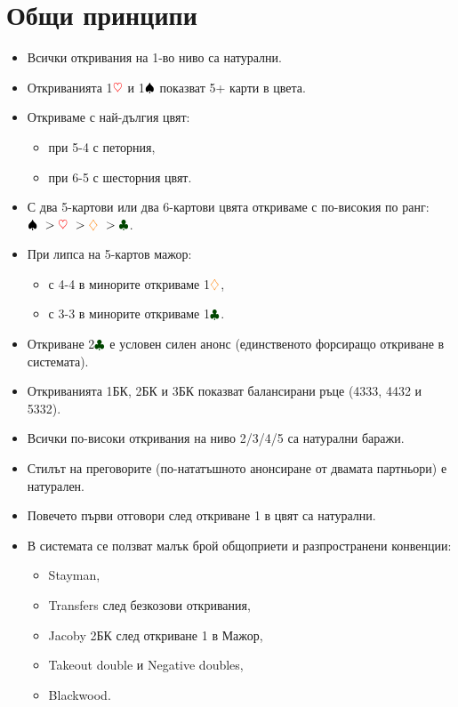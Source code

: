 \documentclass[10pt,a5paper]{extarticle}
\newcommand{\Rheart}{\textcolor{red}{\heartsuit}}
\newcommand{\Rdiamond}{\textcolor{orange}{\diamondsuit}}
\newcommand{\Bspade}{\textcolor{black}{\spadesuit}}
\newcommand{\Bclub}{\textcolor{darkgreen}{\clubsuit}}
\begin{document}
\tableofcontents

\section*{Общи принципи}

\begin{itemize}
    \item[] Всички откривания на 1-во ниво са натурални.
    \item[] Откриванията 1$\Rheart$ и 1$\Bspade$ показват 5+ карти в цвета.
    \item[] Откриваме с най-дългия цвят:
        \begin{itemize}
            \item[] при 5-4 с петорния,
            \item[] при 6-5 с шесторния цвят.
        \end{itemize}
    \item[] С два 5-картови или два 6-картови цвята откриваме с по-високия по ранг: $\Bspade\ > \Rheart\ > \Rdiamond\ > \Bclub$.
    \item[] При липса на 5-картов мажор:
        \begin{itemize}
            \item[] с 4-4 в минорите откриваме 1$\Rdiamond$,
            \item[] с 3-3 в минорите откриваме 1$\Bclub$.
        \end{itemize}
    \item[] Откриване 2$\Bclub$ е условен силен анонс (единственото форсиращо откриване в системата).
    \item[] Откриванията 1БК, 2БК и 3БК показват балансирани ръце (4333, 4432 и 5332).
    \item[] Всички по-високи откривания на ниво 2/3/4/5 са натурални баражи.
    \item[] Стилът на преговорите (по-нататъшното анонсиране от двамата партньори) е натурален.
    \item[] Повечето първи отговори след откриване 1 в цвят са натурални.
    \item[] В системата се ползват малък брой общоприети и разпространени конвенции:
        \begin{itemize}
            \item[] Stayman,
            \item[] Transfers след безкозови откривания,
            \item[] Jacoby 2БК след откриване 1 в Мажор,
            \item[] Takeout double и Negative doubles,
            \item[] Blackwood.
        \end{itemize}
\end{itemize}
\end{document}
